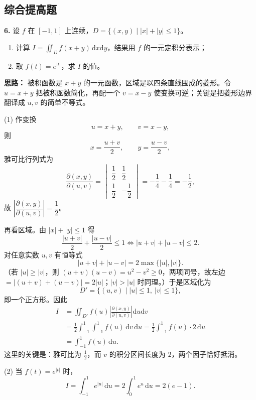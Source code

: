 \else \answerarea[8] \fi%

\subsection{综合提高题}

\textbf{6.} 设 $f$ 在 $[-1,1]$ 上连续，$D=\{(x,y)\mid |x|+|y|\le1\}$。
\begin{enumerate}
  \item[(1)] 计算 $\displaystyle I=\iint_D f(x+y)\,\mathrm{d}x\mathrm{d}y$，结果用 $f$ 的一元定积分表示；
  \item[(2)] 取 $f(t)=e^{|t|}$，求 $I$ 的值。
\end{enumerate}

\ifshowsolutions%
\textbf{思路：} 被积函数是 $x+y$ 的一元函数，区域是以四条直线围成的菱形。令 $u=x+y$ 把被积函数简化，再配一个 $v=x-y$ 使变换可逆；关键是把菱形边界翻译成 $u,v$ 的简单不等式。

(1) 作变换
\[
u=x+y,\qquad v=x-y,
\]
则
\[
x=\frac{u+v}{2},\qquad y=\frac{u-v}{2},
\]
雅可比行列式为
\[
\frac{\partial(x,y)}{\partial(u,v)}
=\begin{vmatrix}
\dfrac12 & \dfrac12\\[6pt]
\dfrac12 & -\dfrac12
\end{vmatrix}
=-\frac14-\frac14=-\frac12,
\]
故 $\left|\dfrac{\partial(x,y)}{\partial(u,v)}\right|=\dfrac12$。

再看区域。由 $|x|+|y|\le1$ 得
\[
\frac{|u+v|}{2}+\frac{|u-v|}{2}\le1
\iff |u+v|+|u-v|\le2.
\]
对任意实数 $u,v$ 有恒等式
\[
|u+v|+|u-v|=2\max\{|u|,|v|\}.
\]
（若 $|u|\ge|v|$，则 $(u+v)(u-v)=u^2-v^2\ge0$，两项同号，故左边 $=|(u+v)+(u-v)|=2|u|$；$|v|>|u|$ 时同理。）于是区域化为
\[
D'=\{(u,v)\mid |u|\le1,\ |v|\le1\},
\]
即一个正方形。因此
\[
\begin{aligned}
I
&=\iint_{D'} f(u)\left|\frac{\partial(x,y)}{\partial(u,v)}\right|\mathrm{d}u\mathrm{d}v\\
&=\frac12\int_{-1}^{1}\!\!\int_{-1}^{1} f(u)\,\mathrm{d}v\,\mathrm{d}u
=\frac12\int_{-1}^{1} f(u)\cdot 2\,\mathrm{d}u\\
&=\int_{-1}^{1} f(u)\,\mathrm{d}u.
\end{aligned}
\]
这里的关键是：雅可比为 $\frac12$，而 $v$ 的积分区间长度为 $2$，两个因子恰好抵消。

(2) 当 $f(t)=e^{|t|}$ 时，
\[
I=\int_{-1}^{1}e^{|u|}\,\mathrm{d}u
=2\int_0^1 e^u\,\mathrm{d}u
=2(e-1).
\]


